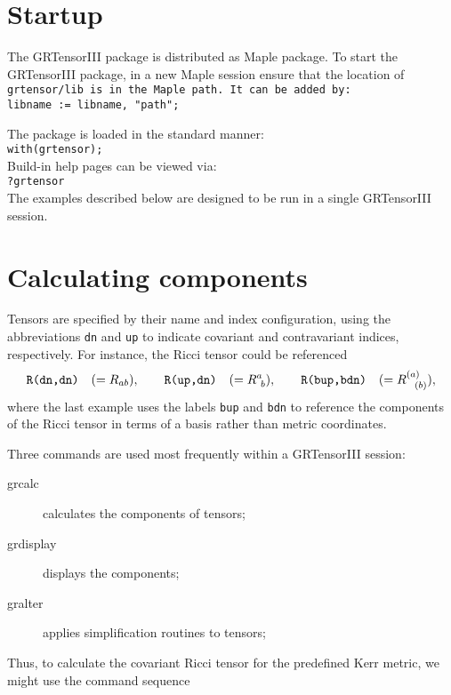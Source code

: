 \documentclass{article}
\begin{document}
%
\section{Startup}
The GRTensorIII package is distributed as Maple package. 
To start the GRTensorIII package, in a new Maple session ensure
that the location of \text\tt{grtensor/lib} is in the Maple path. It can be added
by:\\

\noindent\texttt{libname := libname, "path";}

The package is loaded in the standard manner:\\

\noindent\texttt{with(grtensor);}\\

Build-in help pages can be viewed via:\\

\noindent\texttt{?grtensor}\\

The examples described below are designed to be run in a single
GRTensorIII session.
\section{Calculating components}
Tensors are specified by their name and index configuration, using the
abbreviations {\tt dn} and {\tt up} to indicate covariant and
contravariant indices, respectively. For instance, the Ricci tensor
could be referenced
\[
  \text{\tt R(dn,dn)}\quad (= R_{ab}),\qquad
  \text{\tt R(up,dn)}\quad (= R^a_{\ b}), \qquad
  \text{\tt R(bup,bdn)}\quad (= R^{(a)}_{\ \ (b)}),
\]
where the last example uses the labels {\tt bup} and {\tt bdn} to
reference the components of the Ricci tensor in terms of a basis
rather than metric coordinates.

Three commands are used most frequently within a GRTensorIII session:
\begin{description}
  \item[grcalc] calculates the components of tensors;
  \item[grdisplay] displays the components;
  \item[gralter] applies simplification routines to tensors;
\end{description}
Thus, to calculate the covariant Ricci tensor for the predefined Kerr metric,
we might use the command sequence\\
\end{document}
